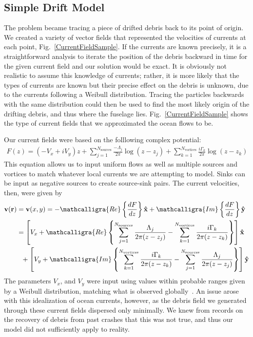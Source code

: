 \documentclass[pre,12pt]{revtex4-1}
\begin{document}
\subsection{Simple Drift Model}
The problem became tracing a piece of drifted debris back to its point of origin. We created a variety of vector fields that represented the velocities of currents at each point, Fig.~\ref{CurrentFieldSample}. If the currents are known precisely, it is a straightforward analysis to iterate the position of the debris backward in time for the given current field and our solution would be exact. It is obviously not realistic to assume this knowledge of currents; rather, it is more likely that the types of currents are known but their precise effect on the debris is unknown, due to the currents following a Weibull distribution. Tracing the particles backwards with the same distribution could then be used to find the most likely origin of the drifting debris, and thus where the fuselage lies. Fig.~\ref{CurrentFieldSample} shows the type of current fields that we approximated the ocean flows to be.

Our current fields were based on the folllowing complex potential:
\begin{gather}\label{potential}
 F(z) = (-V_x+iV_y)z + \sum_{j=1}^{N_\text{sources}} \frac{-\Lambda_j}{2\pi} \log{(z-z_j)}+\sum_{k=1}^{N_\text{vortices}} \frac{i \Gamma_k}{2\pi}\log{(z-z_k)}
\end{gather}
This equation allows us to input uniform flows as well as multiple sources and vortices to match whatever local currents we are attempting to model. Sinks can be input as negative sources to create source-sink pairs.
The current velocities, then, were given by
\begin{align}\label{velocities}
\mathbf{v}(\mathbf{r})&=\mathbf{v}(x,y)= -\mathcalligra{Re}\left\{\frac{dF}{dz}\right\} \mathbf{\hat{x}} + \mathcalligra{Im}\left\{\frac{dF}{dz}\right\} \mathbf{\hat{y}} \\ &= \left[V_x + \mathcalligra{Re}\left\{\sum_{j=1}^{N_\text{sources}}\frac{\Lambda_j}{2 \pi (z-z_j)} - \sum_{k=1}^{N_\text{vortices}} \frac{i \Gamma_k}{2 \pi (z-z_k)}\right\}\right]\mathbf{\hat{x}} \nonumber \\ & \ \ +\left[V_y + \mathcalligra{Im}\left\{ \sum_{k=1}^{N_\text{vortices}}\frac{i \Gamma_k}{2 \pi (z-z_k)} - \sum_{j=1}^{N_\text{sources}}\frac{\Lambda_j}{2 \pi (z-z_j)} \right\}\right]\mathbf{\hat{y}}
\end{align}
The parameters $V_x$, and $V_y$ were input using values within probable ranges given by a Weibull distribution, matching what is observed globally~\cite{SurfaceCurrents}. An issue arose with this idealization of ocean currents, however, as the debris field we generated through these current fields dispersed only minimally. We knew from records on the recovery of debris from past crashes that this was not true, and thus our model did not sufficiently apply to reality.
\end{document}
